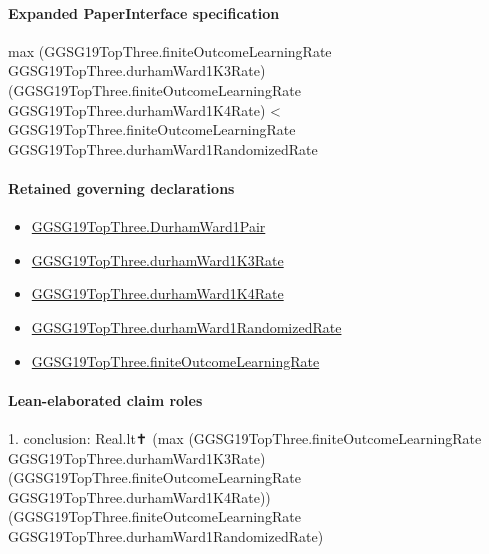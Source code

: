 \documentclass[10pt]{article}
\begin{document}
\paragraph{Expanded PaperInterface specification}
\begin{ReviewVerbatim}
max (GGSG19TopThree.finiteOutcomeLearningRate GGSG19TopThree.durhamWard1K3Rate)
    (GGSG19TopThree.finiteOutcomeLearningRate GGSG19TopThree.durhamWard1K4Rate) <
  GGSG19TopThree.finiteOutcomeLearningRate GGSG19TopThree.durhamWard1RandomizedRate
\end{ReviewVerbatim}

\paragraph{Retained governing declarations}
\begin{itemize}\raggedright
\item \hyperlink{governing-declaration-ebf167db90ad8758}{GGSG19\allowbreak{}Top\allowbreak{}Three.\allowbreak{}Durham\allowbreak{}Ward1\allowbreak{}Pair}
\item \hyperlink{governing-declaration-9129047be09ce4b7}{GGSG19\allowbreak{}Top\allowbreak{}Three.\allowbreak{}durham\allowbreak{}Ward1\allowbreak{}K3\allowbreak{}Rate}
\item \hyperlink{governing-declaration-f48466dba06287fc}{GGSG19\allowbreak{}Top\allowbreak{}Three.\allowbreak{}durham\allowbreak{}Ward1\allowbreak{}K4\allowbreak{}Rate}
\item \hyperlink{governing-declaration-3b050097705cc0fc}{GGSG19\allowbreak{}Top\allowbreak{}Three.\allowbreak{}durham\allowbreak{}Ward1\allowbreak{}Randomized\allowbreak{}Rate}
\item \hyperlink{governing-declaration-6ccba7634ffd53cd}{GGSG19\allowbreak{}Top\allowbreak{}Three.\allowbreak{}finite\allowbreak{}Outcome\allowbreak{}Learning\allowbreak{}Rate}
\end{itemize}
\paragraph{Lean-elaborated claim roles}\begin{ReviewVerbatim}
1. conclusion: Real.lt✝
  (max (GGSG19TopThree.finiteOutcomeLearningRate GGSG19TopThree.durhamWard1K3Rate)
    (GGSG19TopThree.finiteOutcomeLearningRate GGSG19TopThree.durhamWard1K4Rate))
  (GGSG19TopThree.finiteOutcomeLearningRate GGSG19TopThree.durhamWard1RandomizedRate)
\end{ReviewVerbatim}
\end{document}
